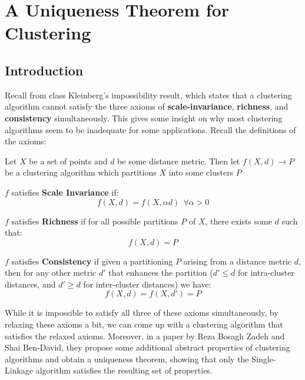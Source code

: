 
\section{A Uniqueness Theorem for Clustering}

\subsection{Introduction}

\medskip

Recall from class Kleinberg's impossibility result, which states that a clustering algorithm cannot satisfy the three axioms of \textbf{scale-invariance}, \textbf{richness}, and \textbf{consistency} simultaneously. This gives some insight on why most clustering algorithms seem to be inadequate for some applications. Recall the definitions of the axioms:

Let $X$ be a set of points and $d$ be some distance metric. Then let $f(X,d) \rightarrow P$ be a clustering algorithm which partitions $X$ into some clusters $P$

\begin{definition}
    $f$ satisfies \textbf{Scale Invariance} if:
    $$
    f(X, d) = f(X, \alpha d) \ \  \forall \alpha > 0
    $$
\end{definition}

\begin{definition}
    $f$ satisfies \textbf{Richness} if for all possible partitions $P$ of $X$, there exists some $d$ such that:
    $$
    f(X, d) = P
    $$
\end{definition}

\begin{definition}
    $f$ satisfies \textbf{Consistency} if given a partitioning $P$ arising from a distance metric $d$, then for any other metric $d'$ that enhances the partition ($d' \leq d$ for intra-cluster distances, and $d' \geq d$ for inter-cluster distances) we have:
    $$
    f(X,d) = f(X,d') = P
    $$
\end{definition}

While it is impossible to satisfy all three of these axioms simultaneously, by relaxing these axioms a bit, we can come up with a clustering algorithm that satisfies the relaxed axioms. Moreover, in a paper by Reza Bosagh Zadeh and Shai Ben-David, they propose some additional abstract properties of clustering algorithms and obtain a uniqueness theorem, showing that only the Single-Linkage algorithm satisfies the resulting set of properties.



